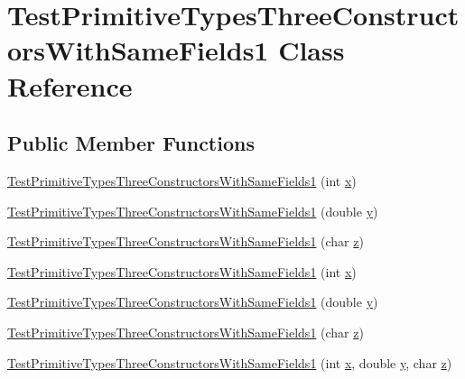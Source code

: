 \hypertarget{classTestPrimitiveTypesThreeConstructorsWithSameFields1}{
\section{TestPrimitiveTypesThreeConstructorsWithSameFields1 Class Reference}
\label{classTestPrimitiveTypesThreeConstructorsWithSameFields1}
}
\subsection*{Public Member Functions}
\begin{DoxyCompactItemize}
\item 
\hyperlink{classTestPrimitiveTypesThreeConstructorsWithSameFields1_a3360aef1457364ed43ddb4e382d6db9d}{TestPrimitiveTypesThreeConstructorsWithSameFields1} (int \hyperlink{classTestPrimitiveTypesThreeConstructorsWithSameFields1_a18dca11d784c0346459504e2abef5b2b}{x})
\item 
\hyperlink{classTestPrimitiveTypesThreeConstructorsWithSameFields1_a00d2fc63a69e25f665aa119ff2c46162}{TestPrimitiveTypesThreeConstructorsWithSameFields1} (double \hyperlink{classTestPrimitiveTypesThreeConstructorsWithSameFields1_ad66f08825b2d1d88229487c0b3a7aca1}{y})
\item 
\hyperlink{classTestPrimitiveTypesThreeConstructorsWithSameFields1_aa163c51112a61904ee4e14eb52903f79}{TestPrimitiveTypesThreeConstructorsWithSameFields1} (char \hyperlink{classTestPrimitiveTypesThreeConstructorsWithSameFields1_addf40fcecc5cabe1d4529367e7730369}{z})
\item 
\hyperlink{classTestPrimitiveTypesThreeConstructorsWithSameFields1_a3360aef1457364ed43ddb4e382d6db9d}{TestPrimitiveTypesThreeConstructorsWithSameFields1} (int \hyperlink{classTestPrimitiveTypesThreeConstructorsWithSameFields1_a18dca11d784c0346459504e2abef5b2b}{x})
\item 
\hyperlink{classTestPrimitiveTypesThreeConstructorsWithSameFields1_a00d2fc63a69e25f665aa119ff2c46162}{TestPrimitiveTypesThreeConstructorsWithSameFields1} (double \hyperlink{classTestPrimitiveTypesThreeConstructorsWithSameFields1_ad66f08825b2d1d88229487c0b3a7aca1}{y})
\item 
\hyperlink{classTestPrimitiveTypesThreeConstructorsWithSameFields1_aa163c51112a61904ee4e14eb52903f79}{TestPrimitiveTypesThreeConstructorsWithSameFields1} (char \hyperlink{classTestPrimitiveTypesThreeConstructorsWithSameFields1_addf40fcecc5cabe1d4529367e7730369}{z})
\item 
\hyperlink{classTestPrimitiveTypesThreeConstructorsWithSameFields1_ac726809bc547f6ec70b454ff1312d796}{TestPrimitiveTypesThreeConstructorsWithSameFields1} (int \hyperlink{classTestPrimitiveTypesThreeConstructorsWithSameFields1_a18dca11d784c0346459504e2abef5b2b}{x}, double \hyperlink{classTestPrimitiveTypesThreeConstructorsWithSameFields1_ad66f08825b2d1d88229487c0b3a7aca1}{y}, char \hyperlink{classTestPrimitiveTypesThreeConstructorsWithSameFields1_addf40fcecc5cabe1d4529367e7730369}{z})
\end{DoxyCompactItemize}
